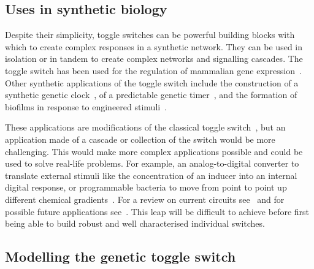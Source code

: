 \subsection{Uses in synthetic biology}
Despite their simplicity, toggle switches can be powerful building blocks with which to create complex responses in a synthetic network. They can be used in isolation or in tandem to create complex networks and signalling cascades. The toggle switch has been used for the regulation of mammalian gene expression~\autocite{Deans:2007cy, Kramer:2004kq}. Other synthetic applications of the toggle switch include the construction of a synthetic genetic clock~\autocite{Atkinson:2003tu}, of a predictable genetic timer~\autocite{Ellis:2009hka}, and the formation of biofilms in response to engineered stimuli~\autocite{Kobayashi:2004cv}. 

These applications are modifications of the classical toggle switch~\autocite{Gardner:2000vha}, but an application made of a cascade or collection of the switch would be more challenging. This would make more complex applications possible and could be used to solve real-life problems. For example, an analog-to-digital converter to translate external stimuli like the concentration of an inducer into an internal digital response, or programmable bacteria to move from point to point up different chemical gradients~\autocite{Lu:2009ez}. For a review on current circuits see~\autocite{Khalil:2010hm} and for possible future applications see~\autocite{Lu:2009ez}. This leap will be difficult to achieve before first being able to build robust and well characterised individual switches.

\subsection{Modelling the genetic toggle switch} 


